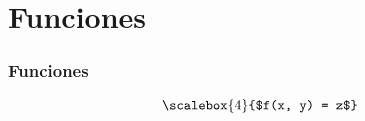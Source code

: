 \section{Funciones}
\newcommand*{\Scale}[2][4]{\scalebox{#1}{$#2$}}%
\begin{frame}
\frametitle{Funciones}

\[\Scale[4]{f(x, y) = z}\]

\end{frame}
